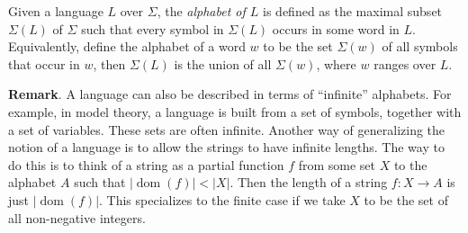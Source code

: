 \documentclass{article}
\begin{document}
Given a language $L$ over $\Sigma$, the \emph{alphabet of $L$} is defined as the maximal subset $\Sigma(L)$ of $\Sigma$ such that every symbol in $\Sigma(L)$ occurs in some word in $L$.  Equivalently, define the alphabet of a word $w$ to be the set $\Sigma(w)$ of all symbols that occur in $w$, then $\Sigma(L)$ is the union of all $\Sigma(w)$, where $w$ ranges over $L$.

\textbf{Remark}.  A language can also be described in terms of ``infinite'' alphabets.  For example, in model theory, a language is built from a set of symbols, together with a set of variables.  These sets are often infinite.  Another way of generalizing the notion of a language is to allow the strings to have infinite lengths.  The way to do this is to think of a string as a partial function $f$ from some set $X$ to the alphabet $A$ such that $|\operatorname{dom}(f)|<|X|$.  Then the length of a string $f:X\to A$ is just $|\operatorname{dom}(f)|$.  This specializes to the finite case if we take $X$ to be the set of all non-negative integers.
\end{document}
